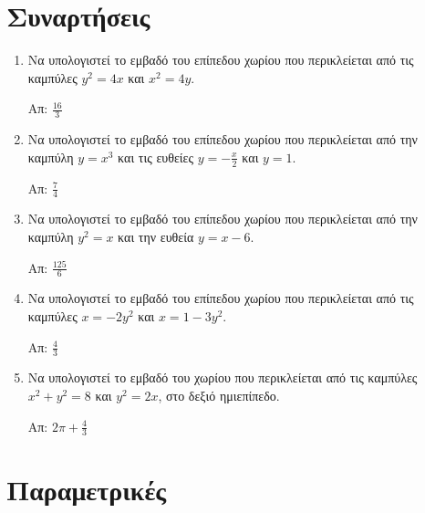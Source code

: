 


\everymath{\displaystyle}

\thispagestyle{askhseis}



\begin{center}
  \minibox{\large\bfseries \textcolor{Col1}{Εμβαδό Επίπεδων Χωρίων}}
\end{center}

\vspace{\baselineskip}



\section*{Συναρτήσεις}


\begin{enumerate}
  \item Να υπολογιστεί το εμβαδό του επίπεδου χωρίου που περικλείεται από τις 
    καμπύλες $ y^{2} = 4x $ και $ x^{2} = 4y $.

    \hfill Απ: $ \frac{16}{3} $

  \item Να υπολογιστεί το εμβαδό του επίπεδου χωρίου που περικλείεται από την 
    καμπύλη  $ y = x^{3} $ και τις ευθείες $ y = -\frac{x}{2} $ και $ y=1 $.

    \hfill Απ: $ \frac{7}{4} $

  \item Να υπολογιστεί το εμβαδό του επίπεδου χωρίου που περικλείεται από την καμπύλη 
    $ y^{2} = x $ και την ευθεία $ y = x-6 $.

    \hfill Απ: $ \frac{125}{6} $

  \item Να υπολογιστεί το εμβαδό του επίπεδου χωρίου που περικλείεται από τις 
    καμπύλες $ x=-2y^{2} $ και $ x=1-3y^{2} $. 

    \hfill Απ: $ \frac{4}{3} $  

  \item Να υπολογιστεί το εμβαδό του χωρίου που περικλείεται από τις καμπύλες $
    x^{2} + y^{2} = 8 $ και $ y^{2} = 2x $, στο δεξιό ημιεπίπεδο.

    \hfill Απ: $ 2 \pi + \frac{4}{3} $
\end{enumerate}


\section*{Παραμετρικές}

